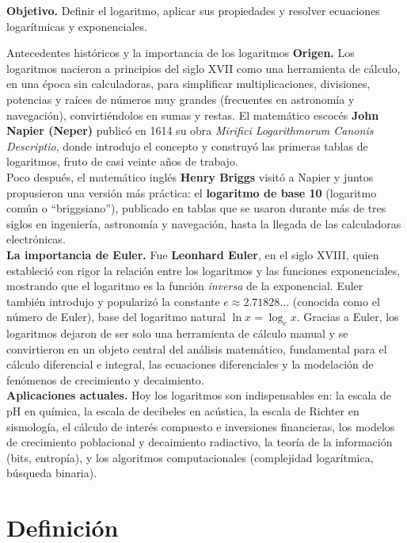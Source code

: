 \documentclass[12pt,letterpaper]{book}
\begin{document}
\textbf{Objetivo.} Definir el logaritmo, aplicar sus propiedades y resolver ecuaciones logarítmicas y exponenciales.

\begin{histbox}{Antecedentes históricos y la importancia de los logaritmos}
\textbf{Origen.} Los logaritmos nacieron a principios del siglo XVII como una herramienta de cálculo, en una época sin calculadoras, para simplificar multiplicaciones, divisiones, potencias y raíces de números muy grandes (frecuentes en astronomía y navegación), convirtiéndolos en sumas y restas. El matemático escocés \textbf{John Napier (Neper)} publicó en 1614 su obra \emph{Mirifici Logarithmorum Canonis Descriptio}, donde introdujo el concepto y construyó las primeras tablas de logaritmos, fruto de casi veinte años de trabajo.\\[4pt]
Poco después, el matemático inglés \textbf{Henry Briggs} visitó a Napier y juntos propusieron una versión más práctica: el \textbf{logaritmo de base 10} (logaritmo común o ``briggsiano''), publicado en tablas que se usaron durante más de tres siglos en ingeniería, astronomía y navegación, hasta la llegada de las calculadoras electrónicas.\\[4pt]
\textbf{La importancia de Euler.} Fue \textbf{Leonhard Euler}, en el siglo XVIII, quien estableció con rigor la relación entre los logaritmos y las funciones exponenciales, mostrando que el logaritmo es la función \emph{inversa} de la exponencial. Euler también introdujo y popularizó la constante $e\approx2.71828\ldots$ (conocida como el número de Euler), base del logaritmo natural $\ln x = \log_e x$. Gracias a Euler, los logaritmos dejaron de ser solo una herramienta de cálculo manual y se convirtieron en un objeto central del análisis matemático, fundamental para el cálculo diferencial e integral, las ecuaciones diferenciales y la modelación de fenómenos de crecimiento y decaimiento.\\[4pt]
\textbf{Aplicaciones actuales.} Hoy los logaritmos son indispensables en: la escala de pH en química, la escala de decibeles en acústica, la escala de Richter en sismología, el cálculo de interés compuesto e inversiones financieras, los modelos de crecimiento poblacional y decaimiento radiactivo, la teoría de la información (bits, entropía), y los algoritmos computacionales (complejidad logarítmica, búsqueda binaria).
\end{histbox}

\section{Definición}
\end{document}
